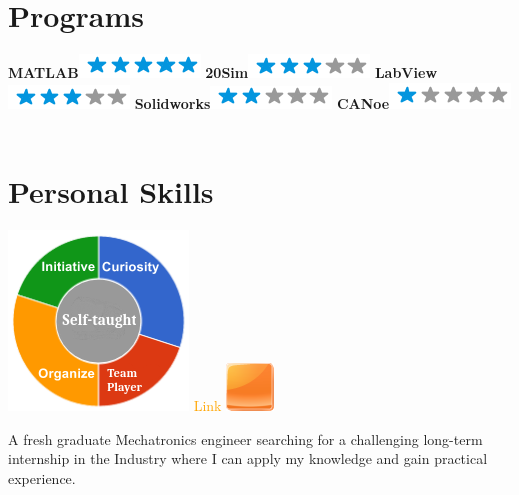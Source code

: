 \documentclass[]{friggeri-cv}
\begin{document}
\begin{aside}
  \section{Programs}
    \textbf{MATLAB}\includegraphics[scale=0.40]{img/5stars.png}
    \textbf{20Sim}\includegraphics[scale=0.40]{img/3stars.png}
    \textbf{LabView}\includegraphics[scale=0.40]{img/3stars.png}
    \textbf{Solidworks}\includegraphics[scale=0.40]{img/2stars.png}
    \textbf{CANoe}\includegraphics[scale=0.40]{img/1stars.png}
    ~
  \section{Personal Skills}
    \includegraphics[scale=0.62]{img/personal.png}
    \textcolor{orange}{{\small Link}}  \includegraphics[scale=0.1]{img/orange.png}
\end{aside}
A fresh graduate Mechatronics engineer searching for a challenging long-term internship in the Industry where I can apply my knowledge and gain practical experience.  
\end{document}

